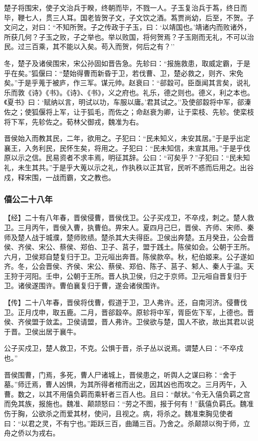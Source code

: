\documentclass[]{article}
\begin{document}
楚子将围宋，使子文治兵于睽，终朝而毕，不戮一人。子玉复治兵于蒍，终日而毕，鞭七人，贯三人耳。国老皆贺子文，子文饮之酒。蒍贾尚幼，后至，不贺。子文问之，对曰：``不知所贺。子之传政于子玉，曰：`以靖国也。'靖诸内而败诸外，所获几何？子玉之败，子之举也。举以败国，将何贺焉？子玉刚而无礼，不可以治民。过三百乘，其不能以入矣。苟入而贺，何后之有？''

冬，楚子及诸侯围宋，宋公孙固如晋告急。先轸曰：``报施救患，取威定霸，于是乎在矣。''狐偃曰：``楚始得曹而新昏于卫，若伐曹、卫，楚必救之，则齐、宋免矣。''于是乎蒐于被庐，作三军。谋元帅。赵衰曰：``郤縠可。臣亟闻其言矣，说礼乐而敦《诗》《书》。《诗》、《书》，义之府也。礼乐，德之则也。德义，利之本也。《夏书》曰：`赋纳以言，明试以功，车服以庸。'君其试之。''及使郤縠将中军，郤溱佐之；使狐偃将上军，让于狐毛，而佐之；命赵衰为卿，让于栾枝、先轸。使栾枝将下军，先轸佐之。荀林父御戎，魏准为右。

晋侯始入而教其民，二年，欲用之。子犯曰：``民未知义，未安其居。''于是乎出定襄王，入务利民，民怀生矣，将用之。子犯曰：``民未知信，未宣其用。''于是乎伐原以示之信。民易资者不求丰焉，明征其辞。公曰：``可矣乎？''子犯曰：``民未知礼，未生其共。''于是乎大蒐以示之礼，作执秩以正其官，民听不惑而后用之。出谷戍，释宋围，一战而霸，文之教也。

\hypertarget{header-n961}{%
\subsubsection{僖公二十八年}\label{header-n961}}

【经】二十有八年春，晋侯侵曹，晋侯伐卫。公子买戍卫，不卒戍，刺之。楚人救卫。三月丙午，晋侯入曹，执曹伯。畀宋人。夏四月己巳，晋侯、齐师、宋师、秦师及楚人战于城濮，楚师败绩。楚杀其大夫得臣。卫侯出奔楚。五月癸丑，公会晋侯、齐侯、宋公、蔡侯、郑伯、卫子、莒子，盟于践土。陈侯如会。公朝于王所。六月，卫侯郑自楚复归于卫。卫元咺出奔晋。陈侯款卒。秋，杞伯姬来。公子遂如齐。冬，公会晋侯、齐侯、宋公、蔡侯、郑伯、陈子、莒子、邾人、秦人于温。天王狩于河阳。壬申，公朝于王所。晋人执卫侯，归之于京师。卫元咺自晋复归于卫。诸侯遂围许。曹伯襄复归于曹，遂会诸侯围许。

【传】二十八年春，晋侯将伐曹，假道于卫，卫人弗许。还，自南河济。侵曹伐卫。正月戊申，取五鹿。二月，晋郤縠卒。原轸将中军，胥臣佐下军，上德也。晋侯、齐侯盟于敛盂。卫侯请盟，晋人弗许。卫侯欲与楚，国人不欲，故出其君以说于晋。卫侯出居于襄牛。

公子买戍卫，楚人救卫，不克。公惧于晋，杀子丛以说焉。谓楚人曰：``不卒戍也。''

晋侯围曹，门焉，多死，曹人尸诸城上，晋侯患之，听舆人之谋曰称：``舍于墓。''师迁焉，曹人凶惧，为其所得者棺而出之，因其凶也而攻之。三月丙午，入曹。数之，以其不用僖负羁而乘轩者三百人也。且曰：``献状。''令无入僖负羁之宫而免其族，报施也。魏准、颠颉怒曰：``劳之不图，报于何有！''蓺僖负羁氏。魏准伤于胸，公欲杀之而爱其材，使问，且视之。病，将杀之。魏准束胸见使者曰：``以君之灵，不有宁也。''距跃三百，曲踊三百。乃舍之。杀颠颉以徇于师，立舟之侨以为戎右。
\end{document}
